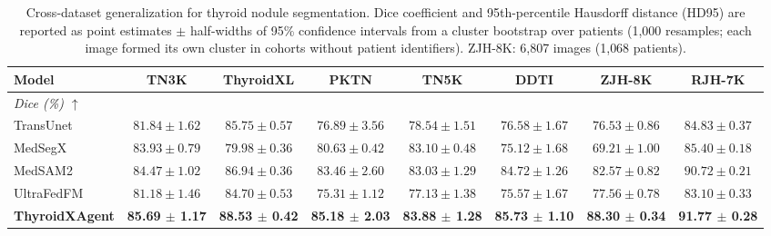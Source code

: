 \begin{table}[p]
\centering
\begin{threeparttable}

\caption{Cross-dataset generalization for thyroid nodule segmentation. Dice coefficient and 95th-percentile Hausdorff distance (HD95) are reported as point estimates $\pm$ half-widths of 95\% confidence intervals from a cluster bootstrap over patients (1{,}000 resamples; each image formed its own cluster in cohorts without patient identifiers). ZJH-8K: 6{,}807 images (1{,}068 patients).}
\label{tab:seg_performance}

\footnotesize
\setlength{\tabcolsep}{5.5pt}
\renewcommand{\arraystretch}{1.08}

\begin{tabular}{lccccccc}
\toprule
\textbf{Model}
& \textbf{TN3K}
& \textbf{ThyroidXL}
& \textbf{PKTN}
& \textbf{TN5K}
& \textbf{DDTI}
& \textbf{ZJH-8K}
& \textbf{RJH-7K} \\
\midrule
\multicolumn{8}{l}{\textit{Dice (\%) $\uparrow$}} \\
\midrule
TransUnet~\cite{chen2024transunet}
& $81.84 \pm 1.62$
& $85.75 \pm 0.57$
& $76.89 \pm 3.56$
& $78.54 \pm 1.51$
& $76.58 \pm 1.67$
& $76.53 \pm 0.86$
& $84.83 \pm 0.37$ \\
MedSegX~\cite{zhang2025generalist}
& $83.93 \pm 0.79$
& $79.98 \pm 0.36$
& $80.63 \pm 0.42$
& $83.10 \pm 0.48$
& $75.12 \pm 1.68$
& $69.21 \pm 1.00$
& $85.40 \pm 0.18$ \\
MedSAM2~\cite{ma2025medsam2}
& $84.47 \pm 1.02$
& $86.94 \pm 0.36$
& $83.46 \pm 2.60$
& $83.03 \pm 1.29$
& $84.72 \pm 1.26$
& $82.57 \pm 0.82$
& $90.72 \pm 0.21$ \\
UltraFedFM~\cite{jiang2025pretraining}
& $81.18 \pm 1.46$
& $84.70 \pm 0.53$
& $75.31 \pm 1.12$
& $77.13 \pm 1.38$
& $75.57 \pm 1.67$
& $77.56 \pm 0.78$
& $83.10 \pm 0.33$ \\
\rowcolor{lightgray}
\textbf{ThyroidXAgent}
& \textbf{85.69 $\pm$ 1.17}
& \textbf{88.53 $\pm$ 0.42}
& \textbf{85.18 $\pm$ 2.03}
& \textbf{83.88 $\pm$ 1.28}
& \textbf{85.73 $\pm$ 1.10}
& \textbf{88.30 $\pm$ 0.34}
& \textbf{91.77 $\pm$ 0.28} \\


\end{tabular}
\end{threeparttable}
\end{table}
